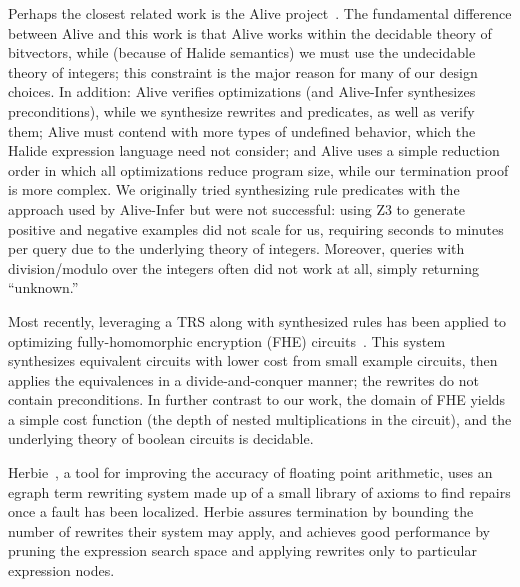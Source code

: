 Perhaps the closest related work is the Alive project~\cite{lopes2015alive,menendez2017aliveinfer}.
The fundamental difference between Alive and this
work is that Alive works within the decidable theory of bitvectors, while
(because of Halide semantics) we must use the undecidable theory of integers;
this constraint is the major reason for many of our design choices. In addition:
Alive verifies optimizations (and Alive-Infer synthesizes preconditions), while
we synthesize rewrites and predicates, as well as verify them; Alive must contend
with more types of undefined behavior, which the Halide expression
language need not consider; and Alive uses a simple reduction order in
which all optimizations reduce program size, while our termination proof is more
complex. We originally tried synthesizing rule predicates with the approach used
by Alive-Infer but were not successful: using Z3 to generate positive and
negative examples did not scale for us, requiring seconds to minutes per query
due to the underlying theory of integers.  Moreover, queries with
division/modulo over the integers often did not work at all, simply returning
``unknown.''

Most recently, leveraging a TRS along with synthesized rules has been applied
to optimizing fully-homomorphic encryption (FHE) circuits~\cite{lee2020fhe}.  This
system synthesizes equivalent circuits with lower cost from small example circuits,
then applies the equivalences in a divide-and-conquer manner; the rewrites do
not contain preconditions. In further contrast to our work, the domain of FHE yields a
simple cost function (the depth of nested multiplications in the circuit), and
the underlying theory of boolean circuits is decidable.

Herbie~\cite{panchekha2015automatically}, a tool for improving the accuracy of floating point arithmetic, uses an egraph term rewriting system made up of a small library of axioms to find repairs once a fault has been localized. Herbie assures termination by bounding the number of rewrites their system may apply, and achieves good performance by pruning the expression search space and applying rewrites only to particular expression nodes. 

